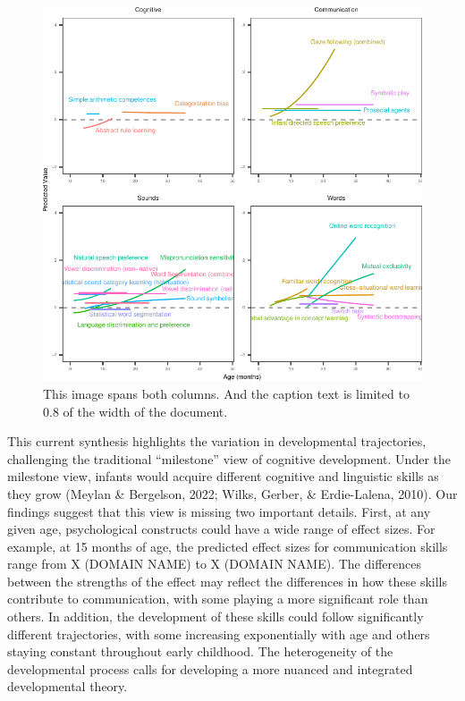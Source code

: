 \documentclass[10pt, letterpaper]{article}
\newenvironment{CodeChunk}{}{}
\begin{document}
\begin{CodeChunk}
\begin{figure}[h]

{\centering \includegraphics{figs/2-col-imageb-1} 

}

\caption[This image spans both columns]{This image spans both columns. And the caption text is limited to 0.8 of the width of the document.}\label{fig:2-col-imageb}
\end{figure}
\end{CodeChunk}

This current synthesis highlights the variation in developmental
trajectories, challenging the traditional ``milestone'' view of
cognitive development. Under the milestone view, infants would acquire
different cognitive and linguistic skills as they grow (Meylan \&
Bergelson, 2022; Wilks, Gerber, \& Erdie-Lalena, 2010). Our findings
suggest that this view is missing two important details. First, at any
given age, psychological constructs could have a wide range of effect
sizes. For example, at 15 months of age, the predicted effect sizes for
communication skills range from X (DOMAIN NAME) to X (DOMAIN NAME). The
differences between the strengths of the effect may reflect the
differences in how these skills contribute to communication, with some
playing a more significant role than others. In addition, the
development of these skills could follow significantly different
trajectories, with some increasing exponentially with age and others
staying constant throughout early childhood. The heterogeneity of the
developmental process calls for developing a more nuanced and integrated
developmental theory.
\end{document}
